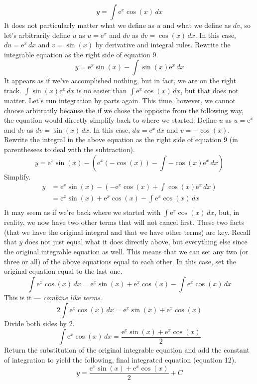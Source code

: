 \documentclass{article}
\begin{document}
\begin{equation*}
    y=\int \text{e}^x\cos(x)\, dx
\end{equation*}
It does not particularly matter what we define as $u$ and what we define as $dv$, so let's arbitrarily define $u$ as $u=\text{e}^x$ and $dv$ as $dv=\cos(x)\, dx$. In this case, $du=\text{e}^x\, dx$ and $v=\sin(x)$ by derivative and integral rules. Rewrite the integrable equation as the right side of equation 9.
\begin{equation*}
    y=\text{e}^x\sin(x)-\int \sin(x)\text{e}^x\, dx
\end{equation*}
It appears as if we've accomplished nothing, but in fact, we are on the right track. $\int \sin(x)\text{e}^x\, dx$ is no easier than $\int \text{e}^x\cos(x)\, dx$, but that does not matter. Let's run integration by parts again. This time, however, we cannot choose arbitratily because the if we chose the opposite from the following way, the equation would directly simplify back to where we started. Define $u$ as $u=\text{e}^x$ and $dv$ as $dv=\sin(x)\, dx$. In this case, $du=\text{e}^x\, dx$ and $v=-\cos(x)$. Rewrite the integral in the above equation as the right side of equation 9 (in parenthesees to deal with the subtraction).
\begin{equation*}
    y=\text{e}^x\sin(x)-\left(\text{e}^x(-\cos(x))-\int -\cos(x)\text{e}^x\, dx\right)
\end{equation*}
Simplify.
\begin{align*}
    y &= \text{e}^x\sin(x)-\left(-\text{e}^x\cos(x)+\int \cos(x)\text{e}^x\, dx\right)\\
    &= \text{e}^x\sin(x)+\text{e}^x\cos(x)-\int \text{e}^x\cos(x)\, dx\\
\end{align*}
It may seem as if we're back where we started with $\int \text{e}^x\cos(x)\, dx$, but, in reality, we now have two other terms that will not cancel first. These two facts (that we have the original integral and that we have other terms) are key. Recall that $y$ does not just equal what it does directly above, but everything else since the original integrable equation as well. This means that we can set any two (or three or all) of the above equations equal to each other. In this case, set the original equation equal to the last one.
\begin{equation*}
    \int \text{e}^x\cos(x)\, dx = \text{e}^x\sin(x)+\text{e}^x\cos(x)-\int \text{e}^x\cos(x)\, dx
\end{equation*}
This is it --- \emph{combine like terms}.
\begin{equation*}
    2\int \text{e}^x\cos(x)\, dx = \text{e}^x\sin(x)+\text{e}^x\cos(x)
\end{equation*}
Divide both sides by 2.
\begin{equation*}
    \int \text{e}^x\cos(x)\, dx = \frac{\text{e}^x\sin(x)+\text{e}^x\cos(x)}{2}
\end{equation*}
Return the substitution of the original integrable equation and add the constant of integration to yield the following, final integrated equation (equation 12).
\begin{equation}
    y = \frac{\text{e}^x\sin(x)+\text{e}^x\cos(x)}{2}+C
\end{equation}
\end{document}
